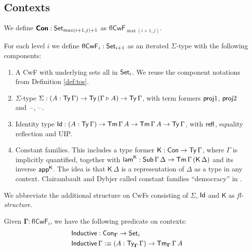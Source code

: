 \documentclass[sigplan,review,anonymous]{acmart}\settopmatter{printfolios=true,printccs=false,printacmref=false}
\newcommand{\ext}{\triangleright}
\newcommand{\Inductive}{\mathsf{Inductive}}
\newcommand{\Sg}{\Sigma}
\newcommand{\flCwF}{\mathsf{flCwF}}
\newcommand{\Kfam}{\mathsf{K}}
\newcommand{\lamK}{\mathsf{lam}^{\K}}
\newcommand{\appK}{\mathsf{app}^{\K}}
\newcommand{\bCon}{\boldsymbol{\Con}}
\newcommand{\bGamma}{\boldsymbol{\Gamma}}
\begin{document}
\subsection{Contexts}

We define $\bCon : \Set_{\max(i+1,j)+1}$ as $\flCwF_{\max(i+1,j)}$.

\begin{definition}\label{def:flCwF}
For each level $i$ we define $\flCwF_i : \Set_{i+1}$ as an iterated $\Sigma$-type
with the following components:
\begin{enumerate}
  \item A CwF with underlying sets all in $\mathsf{Set}_i$. We reuse the component
    notations from Definition \ref{def:tos}.
  \item $\Sigma$-type $\Sg : (A : \Ty\,\Gamma)\ra \Ty\,(\Gamma \ext A)
    \ra \Ty\,\Gamma$, with term formers $\mathsf{proj}1$, $\mathsf{proj}2$ and $\mathord{\hspace{1pt}\text{--}\hspace{1pt}},\mathord{\hspace{1pt}\text{--}\hspace{1pt}}$.
  \item Identity type $\mathsf{Id} : (A : \mathsf{Ty}\,\Gamma)\rightarrow \mathsf{Tm}\,\Gamma\,A\rightarrow
    \mathsf{Tm}\,\Gamma\,A\rightarrow \mathsf{Ty}\,\Gamma$, with $\mathsf{refl}$, equality reflection and UIP.
  \item Constant families. This includes a type former $\Kfam : \Con \ra
    \Ty\,\Gamma$, where $\Gamma$ is implicitly quantified, together with $\lamK
    : \Sub\,\Gamma\,\Delta \ra \Tm\,\Gamma\,(\Kfam\,\Delta)$ and its inverse
    $\appK$. The idea is that $\Kfam\,\Delta$ is a representation of $\Delta$ as
    a type in any context. Clairambault and Dybjer called constant families
    ``democracy'' in \cite{clairambault2014biequivalence}.
\end{enumerate}
\end{definition}

\begin{definition} We abbreviate the additional structure on CwFs consisting of $\Sigma$, $\mathsf{Id}$ and
$\Kfam$ as \emph{fl-structure}.
\end{definition}


\begin{definition}\label{def:induction}
Given $\bGamma : \flCwF_i$, we have the following predicate on contexts:
\begin{alignat*}{3}
  & \Inductive : \Con_{\bGamma} \ra \Set_i \\
  & \Inductive\,\Gamma :\equiv (A : \Ty_{\bGamma}\,\Gamma)\ra \Tm_{\bGamma}\,\Gamma\,A
\end{alignat*}
\end{definition}
\end{document}
